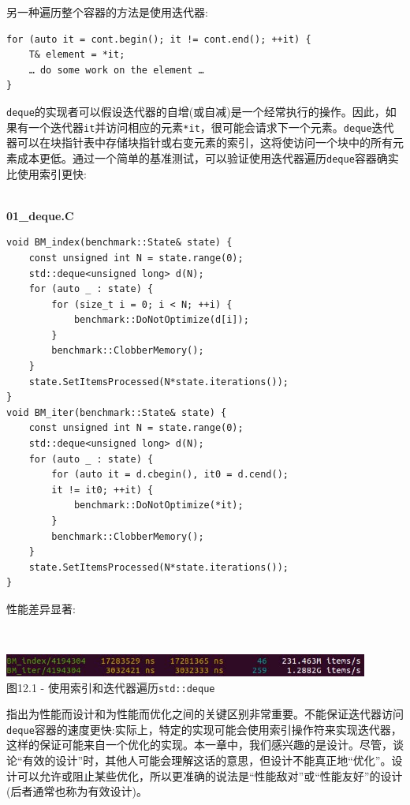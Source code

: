 另一种遍历整个容器的方法是使用迭代器:

\begin{lstlisting}[style=styleCXX]
for (auto it = cont.begin(); it != cont.end(); ++it) {
	T& element = *it;
	… do some work on the element …
}
\end{lstlisting}

\texttt{deque}的实现者可以假设迭代器的自增(或自减)是一个经常执行的操作。因此，如果有一个迭代器\texttt{it}并访问相应的元素\texttt{*it}，很可能会请求下一个元素。\texttt{deque}迭代器可以在块指针表中存储块指针或右变元素的索引，这将使访问一个块中的所有元素成本更低。通过一个简单的基准测试，可以验证使用迭代器遍历\texttt{deque}容器确实比使用索引更快:

\hspace*{\fill} \\ %
\noindent
\textbf{01\_deque.C}
\begin{lstlisting}[style=styleCXX]
void BM_index(benchmark::State& state) {
	const unsigned int N = state.range(0);
	std::deque<unsigned long> d(N);
	for (auto _ : state) {
		for (size_t i = 0; i < N; ++i) {
			benchmark::DoNotOptimize(d[i]);
		}
		benchmark::ClobberMemory();
	}
	state.SetItemsProcessed(N*state.iterations());
}
void BM_iter(benchmark::State& state) {
	const unsigned int N = state.range(0);
	std::deque<unsigned long> d(N);
	for (auto _ : state) {
		for (auto it = d.cbegin(), it0 = d.cend(); 
		it != it0; ++it) {
			benchmark::DoNotOptimize(*it);
		}
		benchmark::ClobberMemory();
	}
	state.SetItemsProcessed(N*state.iterations());
}
\end{lstlisting}

性能差异显著:

\hspace*{\fill} \\ %
\begin{center}
\includegraphics[width=0.9\textwidth]{content/3/chapter12/images/1.jpg}\\
图12.1 - 使用索引和迭代器遍历\texttt{std::deque}
\end{center}

指出为性能而设计和为性能而优化之间的关键区别非常重要。不能保证迭代器访问\texttt{deque}容器的速度更快:实际上，特定的实现可能会使用索引操作符来实现迭代器，这样的保证可能来自一个优化的实现。本一章中，我们感兴趣的是设计。尽管，谈论“有效的设计”时，其他人可能会理解这话的意思，但设计不能真正地“优化”。设计可以允许或阻止某些优化，所以更准确的说法是“性能敌对”或“性能友好”的设计(后者通常也称为有效设计)。

